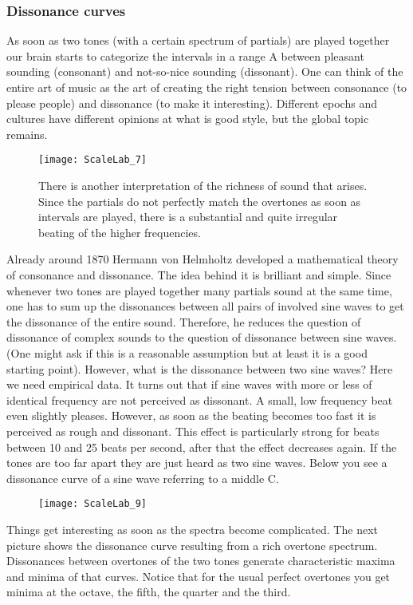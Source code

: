 \subsubsection{Dissonance curves}
As soon as two tones (with a certain spectrum of partials) are played together our brain starts to categorize the intervals in a range
A between pleasant sounding (consonant) and not-so-nice sounding (dissonant). One can think of the entire art of music as the art of creating the right tension between consonance (to please people) and dissonance (to make it interesting). Different epochs and cultures have different opinions at what is good style, but the global topic remains.

\begin{figure}[h]
\centering
\texttt{[image: ScaleLab\_7]}
\caption*{There is another interpretation of the richness of sound that arises. Since the partials do not perfectly match the overtones as soon as intervals are played, there is a substantial and quite irregular beating of the higher frequencies.}
\end{figure}

Already around 1870 Hermann von Helmholtz developed a mathematical theory of consonance and dissonance. The idea behind it is brilliant and simple. Since whenever two tones are played together many partials sound at the same time, one has to sum up the dissonances between all pairs of involved sine waves to get the dissonance of the entire sound. Therefore, he reduces the question of dissonance of complex sounds to the question of dissonance between sine waves. (One might ask if this is a reasonable assumption but at least it is a good starting point). However, what is the dissonance between two sine waves? Here we need empirical data. It turns out that if sine waves with more or less of identical frequency are not perceived as dissonant. A small, low frequency beat even slightly pleases. However, as soon as the beating becomes too fast it is perceived as rough and dissonant. This effect is particularly strong for beats between 10 and 25 beats per second, after that the effect decreases again. If the tones are too far apart they are just heard as two sine waves. Below you see a dissonance curve of a sine wave referring to a middle C.

\begin{figure}[h]
\centering
\texttt{[image: ScaleLab\_9]}
\end{figure}

Things get interesting as soon as the spectra become complicated. The next picture shows the dissonance curve resulting from a rich overtone spectrum. Dissonances between overtones of the two tones generate characteristic maxima and minima of that curves. Notice that for the usual perfect overtones you get minima at the octave, the fifth, the quarter and the third.

